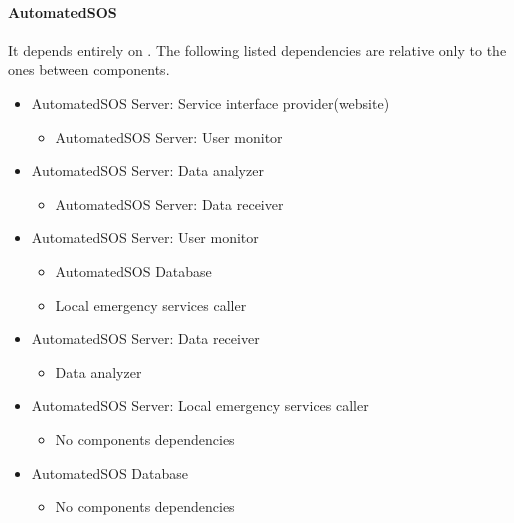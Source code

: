 		\paragraph{AutomatedSOS}
		It depends entirely on . The following listed dependencies are relative only to the ones between  components.
		\begin{itemize}
			\item{AutomatedSOS Server: Service interface provider(website)}
			\begin{itemize}\item{AutomatedSOS Server: User monitor}\end{itemize}

			\item{AutomatedSOS Server: Data analyzer}
			\begin{itemize}\item{AutomatedSOS Server: Data receiver}\end{itemize}

			\item{AutomatedSOS Server: User monitor}
			\begin{itemize}\item{AutomatedSOS Database}\item{Local emergency services caller}\end{itemize}

			\item{AutomatedSOS Server: Data receiver}
			\begin{itemize}\item{Data analyzer}\end{itemize}

			\item{AutomatedSOS Server: Local emergency services caller}
			\begin{itemize}\item{No components dependencies}\end{itemize}

			\item{AutomatedSOS Database}
			\begin{itemize}\item{No components dependencies}\end{itemize}
		\end{itemize}

